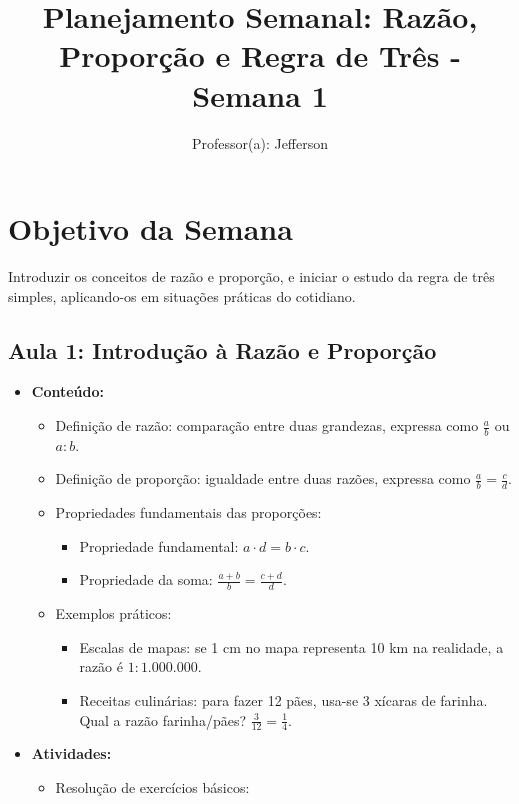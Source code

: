 \documentclass{article}
\title{Planejamento Semanal: Razão, Proporção e Regra de Três - Semana 1}
\author{Professor(a): Jefferson}
\date{}
\begin{document}
\maketitle

\section*{Objetivo da Semana}
Introduzir os conceitos de razão e proporção, e iniciar o estudo da regra de três simples, aplicando-os em situações práticas do cotidiano.

\subsection*{Aula 1: Introdução à Razão e Proporção}
\begin{itemize}
    \item \textbf{Conteúdo:}
    \begin{itemize}
        \item Definição de razão: comparação entre duas grandezas, expressa como \( \frac{a}{b} \) ou \( a : b \).
        \item Definição de proporção: igualdade entre duas razões, expressa como \( \frac{a}{b} = \frac{c}{d} \).
        \item Propriedades fundamentais das proporções:
            \begin{itemize}
                \item Propriedade fundamental: \( a \cdot d = b \cdot c \).
                \item Propriedade da soma: \( \frac{a + b}{b} = \frac{c + d}{d} \).
            \end{itemize}
        \item Exemplos práticos:
            \begin{itemize}
                \item Escalas de mapas: se 1 cm no mapa representa 10 km na realidade, a razão é \( 1:1.000.000 \).
                \item Receitas culinárias: para fazer 12 pães, usa-se 3 xícaras de farinha. Qual a razão farinha/pães? \( \frac{3}{12} = \frac{1}{4} \).
            \end{itemize}
    \end{itemize}
    \item \textbf{Atividades:}
    \begin{itemize}
        \item Resolução de exercícios básicos:
            \begin{enumerate}

\end{enumerate}
\end{itemize}
\end{itemize}
\end{document}
